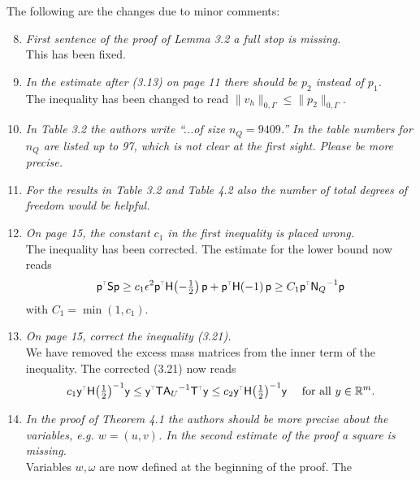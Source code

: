\documentclass[10pt, a4paper]{article}
\newcommand*{\Scale}[2][4]{\scalebox{#1}{$#2$}}%
\newcommand{\reals}{\mathbb{R}}
\newcommand{\norm}[1]{\lVert#1\rVert}
\newcommand{\open}[1]{\left(#1\right)}
\newcommand{\Amat}{\ensuremath{\mathsf{A}}}
\newcommand{\Tmat}{\ensuremath{\mathsf{T}}}
\newcommand{\Hmat}[1]{\ensuremath{\mathsf{H}\!\left(#1\right)}}
\newcommand{\mat}[1]{\ensuremath{\mathsf{#1}}}
\newcommand{\inv}[1]{\ensuremath{{#1}^{-1}}}
\newcommand{\transp}[1]{\ensuremath{{#1}^{\Scale[0.5]{\top}}}}
\renewcommand{\vec}[1]{\mat{#1}}
\begin{document}
The following are the changes due to minor comments:

\begin{enumerate}
\setcounter{enumi}{7}
  \item{\textit{First sentence of the proof of Lemma 3.2 a full stop is missing.}\\
    This has been fixed.
}
  \item{\textit{In the estimate after (3.13) on page 11 there should be $p_2$
    instead of $p_1$.}\\
    The inequality has been changed to read $\norm{v_h}_{0, \Gamma}\leq
    \norm{p_2}_{0, \Gamma}$.
}
  \item{\textit{In Table 3.2 the authors write ``...of size $n_Q=9409$.'' In the
    table numbers for $n_Q$ are listed up to 97, which is not clear at the first
    sight. Please be more precise.}
}
  \item{\textit{For the results in Table 3.2 and Table 4.2 also the number of
    total degrees of freedom would be helpful.}
}
  \item{\textit{On page 15, the constant $c_1$ in the first inequality is placed
    wrong.}\\
    The inequality has been corrected. The estimate for the lower bound now reads
  \[
  \transp{\vec{p}} \mat{S} \vec{p}
  \geq
    c_1\epsilon^2\transp{\vec{p}} \Hmat{-\tfrac{1}{2}} \vec{p} + 
  \transp{\vec{p}} \Hmat{-1} \vec{p}\\
  \geq 
  C_1 \transp{\vec{p}} \inv{\mat{N}_Q} \vec{p}
  \]
  with $C_1=\min\open{1, c_1}$.\qquad
}
  \item{\textit{On page 15, correct the inequality (3.21).}\\
    We have removed the excess mass matrices from the inner term of the
    inequality. The corrected (3.21) now reads
  \begin{equation}
    c_1\transp{\vec{y}} \inv{\Hmat{\tfrac{1}{2}}} \vec{y}
    \leq
    \transp{\vec{y}} \Tmat\inv{\Amat_{{U}}}\transp{\Tmat} \vec{y}
    \leq      
    c_2\transp{\vec{y}} \inv{\Hmat{\tfrac{1}{2}}} \vec{y}
    \quad \text{ for all } y \in \reals^{m}.
  \end{equation}
}
  \item{\textit{In the proof of Theorem 4.1 the authors should be more precise
    about the variables, e.g. $w=(u, v)$. In the second estimate of the proof a
    square is missing.}\\
    Variables $w, \omega$ are now defined at the beginning of the proof. The
}
\end{enumerate}
\end{document}
